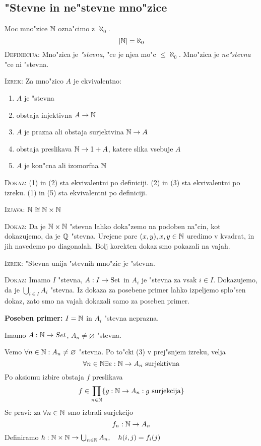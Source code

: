 \subsection{"Stevne in ne"stevne mno"zice}
Moc mno"zice $\mathbb{N}$ ozna"cimo z $\aleph_0$.
\begin{equation*}
|\mathbb{N}| = \aleph_0
\end{equation*}
%
\textsc{Definiicija:} Mno"zica je \emph{"stevna}, "ce je njea mo"c $\leq \aleph_0$. Mno"zica je \emph{ne"stevna} "ce ni "stevna.

\textsc{Izrek:} Za mno"zico $A$ je ekvivalentno:
\begin{enumerate}
	\item $A$ je "stevna
	\item obstaja injektivna $A \to \mathbb{N}$
	\item $A$ je prazna ali obstaja surjektvina $\mathbb{N} \to A$
	\item obstaja preslikava $\mathbb{N} \to 1 + A$, katere slika vsebuje $A$
	\item $A$ je kon"cna ali izomorfna $\mathbb{N}$
\end{enumerate}
\textsc{Dokaz:} (1) in (2) sta ekvivalentni po definiciji. (2) in (3) sta ekvivalentni po izreku. (1) in (5) sta ekvivalentni po definiciji.

\textsc{Izjava:} $\mathbb{N} \cong \mathbb{N} \times \mathbb{N}$

\textsc{Dokaz:} Da je $\mathbb{N} \times \mathbb{N}$ "stevna lahko doka"zemo na podoben na"cin, kot dokazujemo, da je $\mathbb{Q}$ "stevna. Urejene pare $(x, y), x, y \in \mathbb{N}$ uredimo v kvadrat, in jih navedemo po diagonalah. Bolj korekten dokaz smo pokazali na vajah.

\textsc{Izrek:} "Stevna unija "stevnih mno"zic je "stevna.

\textsc{Dokaz:} Imamo $I$ "stevna, $A: I \to \text{Set}$ in $A_i$ je "stevna za vsak $i \in I$. Dokazujemo, da je $\bigcup_{i \in I} A_i$ "stevna. Iz dokaza za posebene primer lahko izpeljemo splo"sen dokaz, zato smo na vajah dokazali samo za poseben primer.

\textbf{Poseben primer:} $I = \mathbb{N}$ in $A_i$ "stevna neprazna.

Imamo $A: \mathbb{N} \to Set$, $A_n \neq \varnothing$ "stevna.

Vemo $\forall n \in \mathbb{N}: A_n \neq \varnothing$ "stevna. Po to"cki (3) v prej"snjem izreku, velja
\begin{equation*}
\forall n \in \mathbb{N} \exists e : \mathbb{N}\to A_n \text{ surjektivna}
\end{equation*}
Po aksiomu izbire obstaja $f$ preslikava
\begin{equation*}
f \in \prod_{n \in \mathbb{N}} \{g: \mathbb{N} \to A_n: g \text{ surjekcija}\}
\end{equation*}
Se pravi: za $\forall n \in \mathbb{N}$ smo izbrali surjekcijo
\begin{equation*}
f_n : \mathbb{N} \to A_n
\end{equation*}
Definiramo $h: \mathbb{N} \times \mathbb{N} \to \bigcup_{n \in \mathbb{N}} A_n, \quad h(i, j) = f_i (j)$

